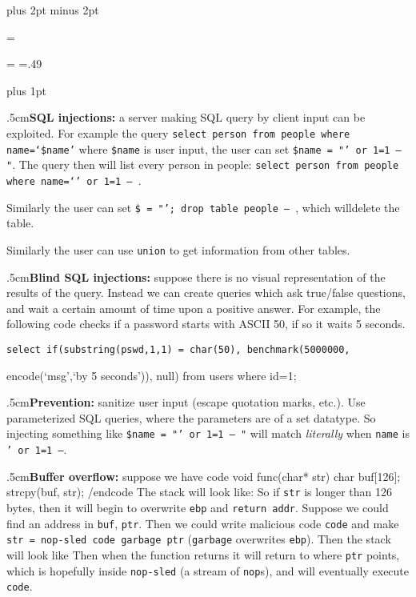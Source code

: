 
\parindent=0pt
\parskip=3pt plus 2pt minus 2pt


\newbox\columnbox
\output={\twocoloutput}

\newdimen\oldhsize \oldhsize=\hsize
\hsize=.49\hsize

\def\twocoloutput{
    \ifvoid\columnbox%
        \global\setbox\columnbox=\vtop{\unvbox255}%
    \else%
        \shipout\hbox to\oldhsize{\vtop{\box\columnbox}\hfill\vtop{\kern\z@\box255}}%
    \fi%
}

\abovedisplayskip=0pt
\belowdisplayskip=0pt


\setscale{8pt}
\baselineskip=1.5pt plus 1pt

\quitvmode\kern.5cm{\bf SQL injections:} a server making SQL query by client input can be exploited.
For example the query {\tt select person from people where name=\allowbreak`\$name'} where {\tt\$name} is user input, the user can set {\tt\$name = "' or 1=1 -- "}.
The query then will list every person in people: {\tt select person from people where name=`' or 1=1 -- }.

Similarly the user can set {\tt\$ = "'; drop table people -- }, which will\hfill\break delete the table.

Similarly the user can use {\tt union} to get information from other tables.

\quitvmode\kern.5cm{\bf Blind SQL injections:} suppose there is no visual representation of the results of the query.
Instead we can create queries which ask true/false questions, and wait a certain amount of time upon a positive answer.
For example, the following code checks if a password starts with ASCII 50, if so it waits 5 seconds.

{\tt select if(substring(pswd,1,1) = char(50), benchmark(5000000,

encode(`msg',`by 5 seconds')), null) from users where id=1;}

\quitvmode\kern.5cm{\bf Prevention:} sanitize user input (escape quotation marks, etc.).
Use parameterized SQL queries, where the parameters are of a set datatype.
So injecting something like {\tt\$name = "' or 1=1 -- "} will match {\it literally} when {\tt name} is {\tt' or 1=1 --}.

\quitvmode\kern.5cm{\bf Buffer overflow:} suppose we have code
\begincode
void func(char* str) {
    char buf[126];
    strcpy(buf, str);
}
/endcode
The stack will look like:
So if {\tt str} is longer than 126 bytes, then it will begin to overwrite {\tt ebp} and {\tt return addr}.
Suppose we could find an address in {\tt buf}, {\tt ptr}.
Then we could write malicious code {\tt code} and make {\tt str = nop-sled\ code\ garbage\ ptr} ({\tt garbage} overwrites {\tt ebp}).
Then the stack will look like
Then when the function returns it will return to where {\tt ptr} points, which is hopefully inside {\tt nop-sled} (a stream of {\tt nop}s), and will eventually execute {\tt code}.

